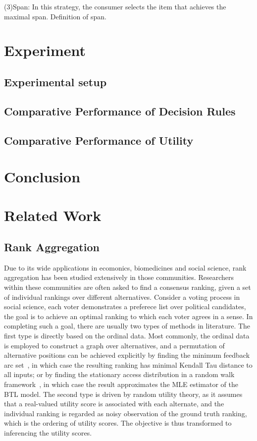 \documentclass[sigconf]{acmart}
\begin{document}
(3)Span: In this strategy, the consumer selects the item that achieves the maximal span. Definition of span. 



\section{Experiment}

\subsection{Experimental setup}

\subsection{Comparative Performance of Decision Rules} 

\subsection{Comparative Performance of Utility}


\section{Conclusion}

\section{Related Work}

\subsection{Rank Aggregation}
Due to its wide applications in ecomonics, biomedicines and social science, rank aggregation has been studied extensively in those communities. Researchers within these communities are often asked to find a consensus ranking, given a set of individual rankings over different alternatives. Consider a voting process in social science, each voter demonstrates a preferece list over political candidates, the goal is to achieve an optimal ranking to which each voter agrees in a sense.  In completing such a goal, there are usually two types of methods in literature. The first type is directly based on the ordinal data. Most commonly, the ordinal data is employed to construct a graph over alternatives, and a permutation of alternative positions can be achieved explicitly by finding the minimum feedback arc set~\cite{Alon2006Ranking}, in which case the resulting ranking has minimal Kendall Tau distance to all inputs; or by finding the stationary access distribution in a random walk framework~\cite{Negahban2012Iterative}, in which case the result approximates the MLE estimator of the BTL model. The second type is driven by random utility theory, as it assumes that a real-valued utility score is associated with each alternate, and the individual ranking is regarded as noisy observation of the ground truth ranking, which is the ordering of utility scores. The objective is thus transformed to inferencing the utility scores.         
\end{document}
